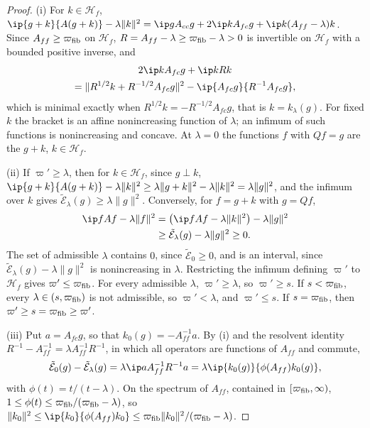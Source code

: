 \begin{proof}
(i) For $k\in\mathcal H_f$, $\ip{g+k}{A(g+k)}-\lambda\lVert k\rVert^2=\ip g
{A_{cc}g}+2\ip k{A_{fc}g}+\ip k{(A_{ff}-\lambda)k}$. Since $A_{ff}\ge
\varpi_{\rm fib}$ on $\mathcal H_f$, $R=A_{ff}-\lambda\ge\varpi_{\rm fib}-
\lambda>0$ is invertible on $\mathcal H_f$ with a bounded positive inverse,
and
\begin{multline*}
2\ip k{A_{fc}g}+\ip k{Rk}\\=\lVert R^{1/2}k+R^{-1/2}A_{fc}g\rVert^2-\ip
{A_{fc}g}{R^{-1}A_{fc}g},
\end{multline*}
which is minimal exactly when $R^{1/2}k=-R^{-1/2}A_{fc}g$, that is $k=
k_\lambda(g)$. For fixed $k$ the bracket is an affine nonincreasing
function of $\lambda$; an infimum of such functions is nonincreasing and
concave. At $\lambda=0$ the functions $f$ with $Qf=g$ are the $g+k$,
$k\in\mathcal H_f$.

(ii) If $\varpi'\ge\lambda$, then for $k\in\mathcal H_f$, since $g\perp k$,
$\ip{g+k}{A(g+k)}-\lambda\lVert k\rVert^2\ge\lambda\lVert g+k\rVert^2-
\lambda\lVert k\rVert^2=\lambda\lVert g\rVert^2$, and the infimum over $k$
gives $\tilde{\mathcal E}_\lambda(g)\ge\lambda\lVert g\rVert^2$. Conversely,
for $f=g+k$ with $g=Qf$,
\begin{align*}
\ip fAf-\lambda\lVert f\rVert^2&=\bigl(\ip fAf-\lambda\lVert k\rVert^2
\bigr)-\lambda\lVert g\rVert^2\\
&\ge\tilde{\mathcal E}_\lambda(g)-\lambda\lVert g\rVert^2\ge0 .
\end{align*}
The set of admissible $\lambda$ contains $0$, since $\tilde{\mathcal E}_0
\ge0$, and is an interval, since $\tilde{\mathcal E}_\lambda(g)-\lambda
\lVert g\rVert^2$ is nonincreasing in $\lambda$. Restricting the infimum
defining $\varpi'$ to $\mathcal H_f$ gives $\varpi'\le\varpi_{\rm fib}$. For
every admissible $\lambda$, $\varpi'\ge\lambda$, so $\varpi'\ge s$. If $s<
\varpi_{\rm fib}$, every $\lambda\in(s,\varpi_{\rm fib})$ is not admissible,
so $\varpi'<\lambda$, and $\varpi'\le s$. If $s=\varpi_{\rm fib}$, then
$\varpi'\ge s=\varpi_{\rm fib}\ge\varpi'$.

(iii) Put $a=A_{fc}g$, so that $k_0(g)=-A_{ff}^{-1}a$. By (i) and the
resolvent identity $R^{-1}-A_{ff}^{-1}=\lambda A_{ff}^{-1}R^{-1}$, in which
all operators are functions of $A_{ff}$ and commute,
\[
\tilde{\mathcal E}_0(g)-\tilde{\mathcal E}_\lambda(g)=\lambda\ip a{A_{ff}
^{-1}R^{-1}a}=\lambda\ip{k_0(g)}{\phi(A_{ff})k_0(g)},
\]
with $\phi(t)=t/(t-\lambda)$. On the spectrum of $A_{ff}$, contained in
$[\varpi_{\rm fib},\infty)$, $1\le\phi(t)\le\varpi_{\rm fib}/(\varpi_{\rm
fib}-\lambda)$, so $\lVert k_0\rVert^2\le\ip{k_0}{\phi(A_{ff})k_0}\le
\varpi_{\rm fib}\lVert k_0\rVert^2/(\varpi_{\rm fib}-\lambda)$.
\end{proof}

